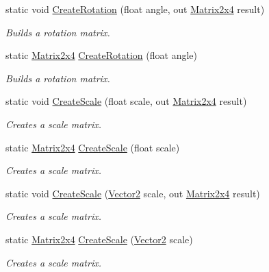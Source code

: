 \begin{DoxyCompactItemize}
\item 
static void \hyperlink{struct_open_t_k_1_1_matrix2x4_a689ae3400a309af723ecc00fcbc83bc5}{Create\-Rotation} (float angle, out \hyperlink{struct_open_t_k_1_1_matrix2x4}{Matrix2x4} result)
\begin{DoxyCompactList}\small\item\em Builds a rotation matrix. \end{DoxyCompactList}\item 
static \hyperlink{struct_open_t_k_1_1_matrix2x4}{Matrix2x4} \hyperlink{struct_open_t_k_1_1_matrix2x4_a41de61f6ed8ee6e61444d09f670aa2f4}{Create\-Rotation} (float angle)
\begin{DoxyCompactList}\small\item\em Builds a rotation matrix. \end{DoxyCompactList}\item 
static void \hyperlink{struct_open_t_k_1_1_matrix2x4_af8b6fbc349b95c307a0a53fa2d4240fc}{Create\-Scale} (float scale, out \hyperlink{struct_open_t_k_1_1_matrix2x4}{Matrix2x4} result)
\begin{DoxyCompactList}\small\item\em Creates a scale matrix. \end{DoxyCompactList}\item 
static \hyperlink{struct_open_t_k_1_1_matrix2x4}{Matrix2x4} \hyperlink{struct_open_t_k_1_1_matrix2x4_a70e986073daa487cb3237396d3104542}{Create\-Scale} (float scale)
\begin{DoxyCompactList}\small\item\em Creates a scale matrix. \end{DoxyCompactList}\item 
static void \hyperlink{struct_open_t_k_1_1_matrix2x4_ad9cbd90742ce9cec81a2fc638ccb3088}{Create\-Scale} (\hyperlink{struct_open_t_k_1_1_vector2}{Vector2} scale, out \hyperlink{struct_open_t_k_1_1_matrix2x4}{Matrix2x4} result)
\begin{DoxyCompactList}\small\item\em Creates a scale matrix. \end{DoxyCompactList}\item 
static \hyperlink{struct_open_t_k_1_1_matrix2x4}{Matrix2x4} \hyperlink{struct_open_t_k_1_1_matrix2x4_afb9b105f8235139a191357e34db4ddb8}{Create\-Scale} (\hyperlink{struct_open_t_k_1_1_vector2}{Vector2} scale)
\begin{DoxyCompactList}\small\item\em Creates a scale matrix. \end{DoxyCompactList}\item 

\end{DoxyCompactItemize}
